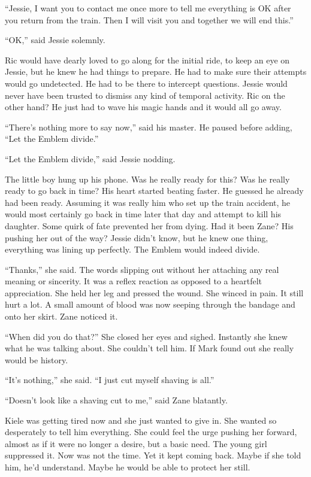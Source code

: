 ``Jessie, I want you to contact me once more to tell me everything is OK after you return from the train.  Then I will visit you and together we will end this.''

``OK,'' said Jessie solemnly.

Ric would have dearly loved to go along for the initial ride, to keep an eye on Jessie, but he knew he had things to prepare.  He had to make sure their attempts would go undetected.  He had to be there to intercept questions.  Jessie would never have been trusted to dismiss any kind of temporal activity.  Ric on the other hand?  He just had to wave his magic hands and it would all go away.

``There's nothing more to say now,'' said his master.  He paused before adding, ``Let the Emblem divide.''

``Let the Emblem divide,'' said Jessie nodding.

The little boy hung up his phone.  Was he really ready for this?  Was he really ready to go back in time?  His heart started beating faster.  He guessed he already had been ready.  Assuming it was really him who set up the train accident, he would most certainly go back in time later that day and attempt to kill his daughter.  Some quirk of fate prevented her from dying.  Had it been Zane?  His pushing her out of the way?  Jessie didn't know, but he knew one thing, everything was lining up perfectly.  The Emblem would indeed divide.



\thoughtbreak



``Thanks,'' she said.  The words slipping out without her attaching any real meaning or sincerity.  It was a reflex reaction as opposed to a heartfelt appreciation.  She held her leg and pressed the wound.  She winced in pain.  It still hurt a lot.  A small amount of blood was now seeping through the bandage and onto her skirt.  Zane noticed it.

``When did you do that?''  She closed her eyes and sighed.  Instantly she knew what he was talking about.  She couldn't tell him.  If Mark found out she really would be history.  

``It's nothing,'' she said.  ``I just cut myself shaving is all.''  

``Doesn't look like a shaving cut to me,'' said Zane blatantly.

Kiele was getting tired now and she just wanted to give in.  She wanted so desperately to tell him everything.  She could feel the urge pushing her forward, almost as if it were no longer a desire, but a basic need.  The young girl suppressed it.  Now was not the time.  Yet it kept coming back.  Maybe if she told him, he'd understand.  Maybe he would be able to protect her still.

